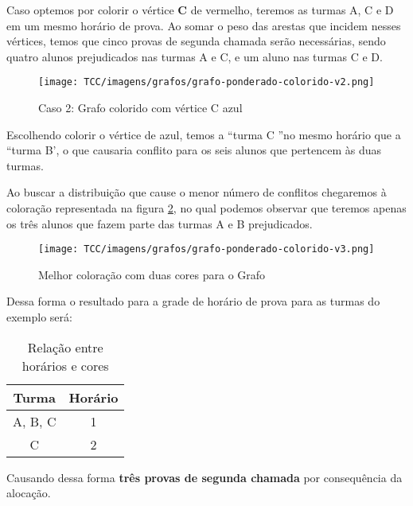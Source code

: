 Caso optemos por colorir o vértice \textbf{C} de vermelho, teremos as turmas A, C e D em um mesmo horário de prova. Ao somar o peso das arestas que incidem nesses vértices, temos que cinco provas de segunda chamada serão necessárias, sendo quatro alunos prejudicados nas turmas A e C, e um aluno nas turmas C e D.

\begin{figure}[H]
     \centering
     \texttt{[image: TCC/imagens/grafos/grafo-ponderado-colorido-v2.png]}
     \caption{Caso 2: Grafo colorido com vértice C azul}
     \label{grafo-ponderado-colorido2}
\end{figure}


Escolhendo colorir o vértice de azul, temos a “turma C ”no mesmo horário que a “turma B', o que causaria conflito para os seis alunos que pertencem às duas turmas.

Ao buscar a distribuição que cause o menor número de conflitos chegaremos à coloração representada na figura \ref{grafo-ponderado-colorido3}, no qual podemos observar que teremos apenas os três alunos que fazem parte das turmas A e B prejudicados.

\begin{figure}[H]
     \centering
     \texttt{[image: TCC/imagens/grafos/grafo-ponderado-colorido-v3.png]}
     \caption{Melhor coloração com duas cores para o Grafo}
     \label{grafo-ponderado-colorido3}
\end{figure}


Dessa forma o resultado para a grade de horário de prova para as turmas do exemplo será:

\begin{table}[H]
    \centering
    \vspace{0.5cm}
    \renewcommand\arraystretch{1.5}
    \begin{tabular}{c|c}
     
        \textbf{Turma} & \textbf{Horário} \\ %
        \hline                               %
        	A, B, C & 1 \\
C  & 2
        \\
        \hline
    \end{tabular}
    \caption{Relação entre horários e cores}
    \label{tabela-relacao4}
\end{table}



Causando dessa forma \textbf{três provas de segunda chamada} por consequência da alocação.



